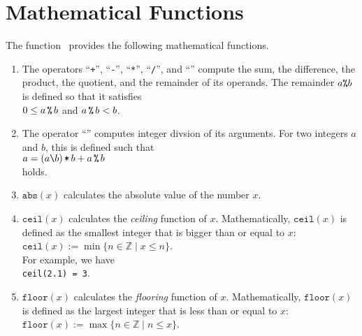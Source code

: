 \section{Mathematical Functions}
The function \setlx\ provides the following mathematical functions.
\begin{enumerate}
\item The operators 
      ``\texttt{+}'',
      ``\texttt{-}'',
      ``\texttt{*}'',
      ``\texttt{/}'', and
      ``\texttt{}'' compute the sum, the difference, the product, the quotient,
      and the remainder of its operands.  The remainder $a \texttt{\symbol{37}} b$ is
      defined so that it satisfies
      \\[0.2cm]
      \hspace*{1.3cm}
      $0 \leq a \,\texttt{\symbol{37}}\, b$ \quad and \quad $a \,\texttt{\symbol{37}}\, b < b$.
\item The operator ``\texttt{}'' computes integer divsion of its arguments.
      For two integers $a$ and $b$, this is defined such that 
      \\[0.2cm]
      \hspace*{1.3cm}
      $a = (a\texttt{\symbol{92}} b) \,\texttt{*}\, b + a \,\texttt{\symbol{37}}\, b$
      \\[0.2cm]
      holds.
\item $\texttt{abs}(x)$ calculates the absolute value of the number $x$.
\item $\texttt{ceil}(x)$ calculates the \emph{ceiling} function of $x$.  Mathematically,
      $\mathtt{ceil}(x)$ is defined as the smallest integer that is bigger than or equal
      to $x$:
      \\[0.2cm]
      \hspace*{1.3cm}
      $\texttt{ceil}(x) := \min \{ n \in \mathbb{Z} \mid x \leq n \}$.
      \\[0.2cm]
      For example, we have
      \\[0.2cm]
      \hspace*{1.3cm}
      \texttt{ceil(2.1) = 3}.
\item $\texttt{floor}(x)$ calculates the \emph{flooring} function of $x$.  Mathematically,
      $\mathtt{floor}(x)$ is defined as the largest integer that is less than or equal
      to $x$:
      \\[0.2cm]
      \hspace*{1.3cm}
      $\texttt{floor}(x) := \max \{ n \in \mathbb{Z} \mid n \leq x \}$.
      \\[0.2cm]

\end{enumerate}
